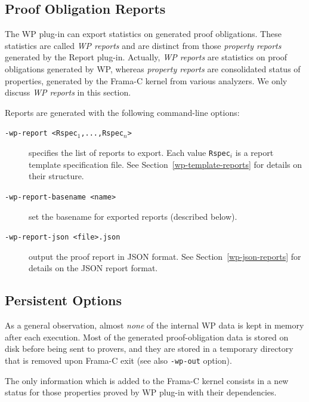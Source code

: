 \subsection{Proof Obligation Reports}

The \textsf{WP} plug-in can export statistics on generated proof
obligations. These statistics are called \textit{WP reports} and are
distinct from those \textit{property reports} generated by the
\textsf{Report} plug-in. Actually, \textit{WP reports} are statistics
on proof obligations generated by \textsf{WP}, whereas
\textit{property reports} are consolidated status of properties,
generated by the \textsf{Frama-C} kernel from various analyzers.
We only discuss \textit{WP reports} in this section.

Reports are generated with the following command-line options:
\begin{description}
\item[\tt -wp-report <Rspec$_1$,...,Rspec$_n$>] specifies the list of
  reports to export.
  Each value \texttt{Rspec$_i$} is a report template specification file.
  See Section~\ref{wp-template-reports} for details on their structure.
\item[\tt -wp-report-basename <name>] set the basename for exported
  reports (described below).
\item[\tt -wp-report-json <file>.json] output the proof report in JSON format.
  See Section~\ref{wp-json-reports} for details on the JSON report format.
\end{description}

\subsection{Persistent Options}
\label{wp-persistent}

As a general observation, almost \emph{none} of the internal
\textsf{WP} data is kept in memory after each execution. Most of the
generated proof-obligation data is stored on disk before being sent to
provers, and they are stored in a temporary directory that is removed
upon \textsf{Frama-C} exit (see also \texttt{-wp-out} option).

The only information which is added to the \textsf{Frama-C} kernel
consists in a new status for those properties proved by \textsf{WP} plug-in with
their dependencies.

